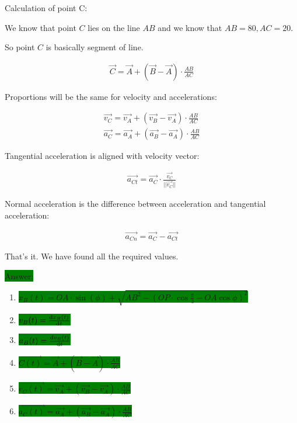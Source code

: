 \documentclass{article}
\begin{document}
Calculation of point C:

We know that point $C$ lies on the line $AB$ and we know that $AB = 80, AC = 20$.

So point $C$ is basically segment of line.

\begin{align}
    \vec{C} = \vec{A} + (\vec{B} - \vec{A}) \cdot \frac{AB}{AC}
\end{align}

Proportions will be the same for velocity and accelerations:

\begin{align}
    \vec{v_C} = \vec{v_A} + (\vec{v_B} - \vec{v_A}) \cdot \frac{AB}{AC} \\
    \vec{a_C} = \vec{a_A} + (\vec{a_B} - \vec{a_A}) \cdot \frac{AB}{AC}
\end{align}

Tangential acceleration is aligned with velocity vector:

\begin{align}
    \vec{a_{Ct}} = \vec{a_C} \cdot \frac{\vec{v_C}}{|| \vec{v_C} ||}
\end{align}

Normal acceleration is the difference between acceleration and tangential acceleration:

\begin{align}
    \vec{a_{Cn}} = \vec{a_C} - \vec{a_{Ct}}
\end{align}

That's it. We have found all the required values.

\colorbox{green}{Answer:}

\begin{enumerate}
    \item \colorbox{green}{$x_B(t) = OA \cdot \sin{(\phi)} + \sqrt{AB^2 - (OP \cdot \cos{\frac{\pi}{3}} - OA \cos{\phi})^2}$}
    \item \colorbox{green}{$v_B(t) = \dv{x_B(t)}{t}$}
    \item \colorbox{green}{$a_B(t) = \dv{v_B(t)}{t}$}
    \item \colorbox{green}{$\vec{C(t)} = \vec{A} + (\vec{B} - \vec{A}) \cdot \frac{AB}{AC}$}
    \item \colorbox{green}{$\vec{v_C(t)} = \vec{v_A} + (\vec{v_B} - \vec{v_A}) \cdot \frac{AB}{AC}$}
    \item \colorbox{green}{$\vec{a_C(t)} = \vec{a_A} + (\vec{a_B} - \vec{a_A}) \cdot \frac{AB}{AC}$}
\end{enumerate}
\end{document}

